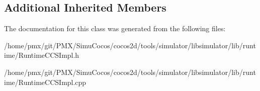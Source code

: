 \subsection*{Additional Inherited Members}


The documentation for this class was generated from the following files\+:\begin{DoxyCompactItemize}
\item 
/home/pmx/git/\+P\+M\+X/\+Simu\+Cocos/cocos2d/tools/simulator/libsimulator/lib/runtime/Runtime\+C\+C\+S\+Impl.\+h\item 
/home/pmx/git/\+P\+M\+X/\+Simu\+Cocos/cocos2d/tools/simulator/libsimulator/lib/runtime/Runtime\+C\+C\+S\+Impl.\+cpp\end{DoxyCompactItemize}
